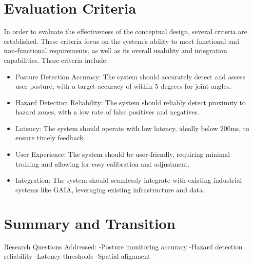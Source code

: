 \section{Evaluation Criteria}
In order to evaluate the effectiveness of the conceptual design, several criteria are established. These criteria focus on the system's ability to meet functional and non-functional requirements, as well as its overall usability and integration capabilities. 
These criteria include:
\begin{itemize}
    \item Posture Detection Accuracy: The system should accurately detect and assess user posture, with a target accuracy of within 5 degrees for joint angles.
    \item Hazard Detection Reliability: The system should reliably detect proximity to hazard zones, with a low rate of false positives and negatives.
    \item Latency: The system should operate with low latency, ideally below 200ms, to ensure timely feedback.
    \item User Experience: The system should be user-friendly, requiring minimal training and allowing for easy calibration and adjustment.
    \item Integration: The system should seamlessly integrate with existing industrial systems like GAIA, leveraging existing infrastructure and data.
\end{itemize}

\section{Summary and Transition}
Research Questions Addressed:
-Posture monitoring accuracy
-Hazard detection reliability
-Latency thresholds
-Spatial alignment
